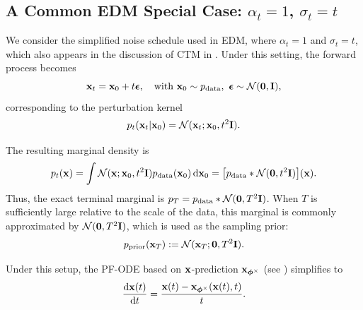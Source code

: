 \subsection{A Common EDM Special Case: $\alpha_t = 1$, $\sigma_t = t$}

We consider the simplified noise schedule used in EDM, where
$\alpha_t = 1$ and $\sigma_t = t$, which also appears in the discussion of
CTM in . Under this setting, the forward process becomes
\[
{\mathbf{x}}_t = {\mathbf{x}}_0 + t\bm{\epsilon},
\quad
\text{with }
{\mathbf{x}}_0 \sim p_{\text{data}},
\,\,
\bm{\epsilon} \sim \mathcal{N}(\bm{0}, {\mathbf{I}}),
\]
corresponding to the perturbation kernel
\[
p_t({\mathbf{x}}_t|{\mathbf{x}}_0)
=
\mathcal{N}({\mathbf{x}}_t; {\mathbf{x}}_0, t^2{\mathbf{I}}).
\]

The resulting marginal density is
\[
p_t({\mathbf{x}})
=
\int
\mathcal{N}({\mathbf{x}};{\mathbf{x}}_0,t^2{\mathbf{I}})
p_{\mathrm{data}}({\mathbf{x}}_0)
\mathop{}\!\mathrm{d}{\mathbf{x}}_0
=
\bigl[
p_{\mathrm{data}}
*
\mathcal{N}(\bm{0},t^2{\mathbf{I}})
\bigr]({\mathbf{x}}).
\]
Thus, the exact terminal marginal is
$p_T=p_{\mathrm{data}}*\mathcal{N}(\bm{0},T^2{\mathbf{I}})$.
When $T$ is sufficiently large relative to the scale of the data, this
marginal is commonly approximated by
$\mathcal{N}(\bm{0},T^2{\mathbf{I}})$, which is used as the sampling prior:
\[
p_{\mathrm{prior}}({\mathbf{x}}_T)
:=
\mathcal{N}({\mathbf{x}}_T;\bm{0},T^2{\mathbf{I}}).
\]

Under this setup, the PF-ODE based on ${\mathbf{x}}$-prediction ${\mathbf{x}}_{\bm{\phi}^\times}$ (see ) simplifies to
\begin{align*}
    \frac{\mathop{}\!\mathrm{d} {\mathbf{x}}(t)}{\mathop{}\!\mathrm{d} t} = \frac{{\mathbf{x}}(t) - {\mathbf{x}}_{\bm{\phi}^\times}({\mathbf{x}}(t), t)}{t}.
\end{align*}

